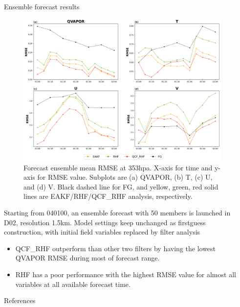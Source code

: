 \documentclass[final]{beamer}
\newlength{\sepwidth}
\newlength{\colwidth}
\newcommand{\separatorcolumn}{\begin{column}{\sepwidth}\end{column}}
\begin{document}
\begin{frame}[t]
\begin{columns}[t]
\begin{column}{\colwidth}
			\begin{block}{Ensemble forecast results}
                \begin{figure}
                  \begin{minipage}[c]{0.7\textwidth}
                    \includegraphics[width=\textwidth]{figure/rmseplot_ensembled02.png}
                  \end{minipage}\hfill
                  \begin{minipage}[c]{0.28\textwidth}
                    \caption{Forecast ensemble mean RMSE at 353hpa. X-axis for time and y-axis for RMSE value. Subplots are (a) QVAPOR, (b) T, (c) U, and (d) V. Black dashed line for FG, and yellow, green, red solid lines are EAKF/RHF/QCF\_RHF analysis, respectively.}\label{rmse_fcst}
                  \end{minipage}\hfill
                \end{figure}
                Starting from 040100, an ensemble forecast with 50 members is launched in D02, resolution 1.5km. Model settings keep unchanged as firstguess construction, with initial field variables replaced by filter analysis
                \begin{itemize}
                    \item QCF\_RHF outperform than other two filters by having the lowest QVAPOR RMSE during most of forecast range.
                    \item RHF has a poor performance with the highest RMSE value for almost all variables at all available forecast time. 
                \end{itemize}

			\end{block}

        \begin{alertblock}{References}
            \printbibliography[heading=none]
        \end{alertblock}

			
		\end{column}
		
		\separatorcolumn
	\end{columns}
\end{frame}
\end{document}
